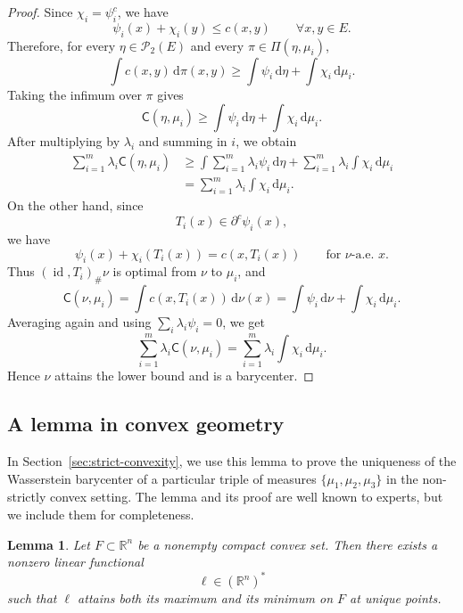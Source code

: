 \documentclass[a4paper,11pt]{article}
\numberwithin{equation}{section}
\newtheorem{lemma}[theorem]{Lemma}
\newcommand{\id}{\operatorname{id}}
\newcommand{\dd}{\mathrm d}
\begin{document}
	\begin{proof}
		Since \(\chi_i=\psi_i^c\), we have
		\[
		\psi_i(x)+\chi_i(y)\le c(x,y)
		\qquad\forall x,y\in E.
		\]
		Therefore, for every \(\eta\in\mathcal P_2(E)\) and every
		\(\pi\in\Pi(\eta,\mu_i)\),
		\[
		\int c(x,y)\,\dd\pi(x,y)
		\ge
		\int\psi_i\,\dd\eta+\int\chi_i\,\dd\mu_i.
		\]
		Taking the infimum over \(\pi\) gives
		\[
		\mathsf C(\eta,\mu_i)
		\ge
		\int\psi_i\,\dd\eta+\int\chi_i\,\dd\mu_i.
		\]
		After multiplying by \(\lambda_i\) and summing in \(i\), we obtain
		\[
		\begin{aligned}
			\sum_{i=1}^m\lambda_i \mathsf C(\eta,\mu_i)
			&\ge
			\int\sum_{i=1}^m\lambda_i\psi_i\,\dd\eta
			+
			\sum_{i=1}^m\lambda_i\int\chi_i\,\dd\mu_i \\
			&=
			\sum_{i=1}^m\lambda_i\int\chi_i\,\dd\mu_i.
		\end{aligned}
		\]
		On the other hand, since
		\[
		T_i(x)\in\partial^c\psi_i(x),
		\]
		we have
		\[
		\psi_i(x)+\chi_i(T_i(x))=c(x,T_i(x))
		\qquad\text{for \(\nu\)-a.e. }x.
		\]
		Thus \((\id,T_i)_\#\nu\) is optimal from \(\nu\) to \(\mu_i\), and
		\[
		\mathsf C(\nu,\mu_i)
		=
		\int c(x,T_i(x))\,\dd\nu(x)
		=
		\int\psi_i\,\dd\nu+\int\chi_i\,\dd\mu_i.
		\]
		Averaging again and using \(\sum_i\lambda_i\psi_i=0\), we get
		\[
		\sum_{i=1}^m\lambda_i \mathsf C(\nu,\mu_i)
		=
		\sum_{i=1}^m\lambda_i\int\chi_i\,\dd\mu_i.
		\]
		Hence \(\nu\) attains the lower bound and is a barycenter.
	\end{proof}
	
	\subsection{A lemma in convex geometry}\label{subsec:convex-geometry-lemma}
	In Section~\ref{sec:strict-convexity}, we use this lemma to prove the uniqueness of the Wasserstein barycenter of a particular triple of measures $\{\mu_1,\mu_2,\mu_3\}$ in the non-strictly convex setting. The lemma and its proof are well known to experts, but we include them for completeness.
	\begin{lemma}\label{lem}
		Let \(F \subset \mathbb{R}^n\) be a nonempty compact convex set. Then there exists a nonzero linear functional
		\[
		\ell \in (\mathbb{R}^n)^*
		\]
		such that \(\ell\) attains both its maximum and its minimum on \(F\) at unique points.
	\end{lemma}
	
\end{document}

